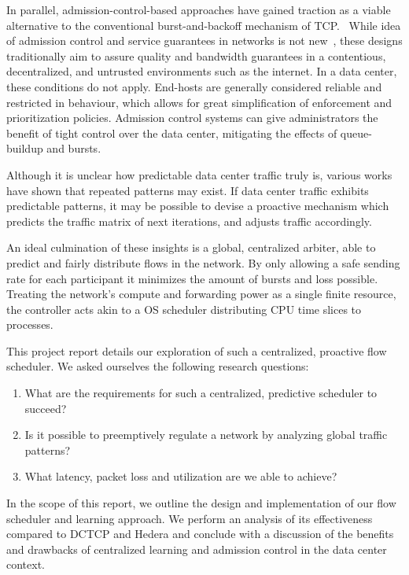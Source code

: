 In parallel, admission-control-based approaches have gained traction as a 
viable alternative to the conventional burst-and-backoff mechanism of 
TCP.~\cite{expresspass, fastpass, perc}
While idea of admission control and service guarantees in networks is not 
new~\cite{access_limit, access_limit2}, these designs traditionally 
aim to assure quality and bandwidth guarantees in a contentious, decentralized, 
and untrusted environments such as the internet. In a data center, these 
conditions do not apply. End-hosts are generally considered reliable and 
restricted in behaviour, which allows for great simplification of enforcement 
and prioritization policies. Admission control systems can give administrators 
the benefit of tight control over the data center, mitigating the effects of 
queue-buildup and bursts.

Although it is unclear how predictable data center traffic truly is, various 
works have shown that repeated patterns may 
exist.\cite{msr_dc,fb_dc,traffic,microte}
If data center traffic exhibits predictable patterns, it may be 
possible to devise a proactive mechanism which predicts the traffic matrix of 
next iterations, and adjusts traffic accordingly.

An ideal culmination of these insights is a global, 
centralized arbiter, able to predict and fairly distribute flows in the 
network. By only allowing a safe sending rate for each participant it minimizes 
the amount of bursts and loss possible.
Treating the network's compute and forwarding power as a single finite 
resource, the controller acts akin to a OS scheduler distributing CPU time 
slices to processes.

This project report details our exploration of such a centralized, 
proactive flow scheduler. We asked ourselves the following research questions:
\begin{enumerate}
    \item What are the requirements for such a centralized, predictive 
    scheduler to succeed?
    \item Is it possible to preemptively regulate a network by analyzing global 
    traffic patterns?
    \item What latency, packet loss and utilization are we able to achieve?
\end{enumerate}
In the scope of this report, we outline the design and implementation of our 
flow scheduler and learning approach. We perform an analysis of its 
effectiveness compared to DCTCP and Hedera and conclude with a discussion of 
the benefits and drawbacks of centralized learning and admission control in the 
data center context.